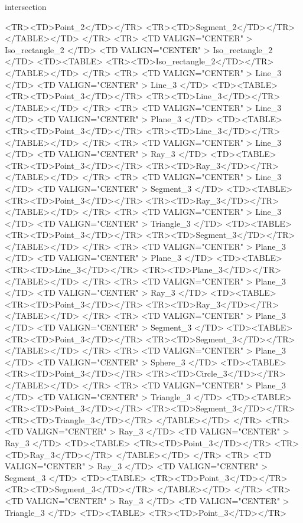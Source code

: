 \begin{ccRefFunction}{intersection}
\begin{ccHtmlOnly}
	<TR><TD>Point_2</TD></TR>
	<TR><TD>Segment_2</TD></TR>
      </TABLE></TD>
</TR>
<TR>
    <TD VALIGN="CENTER" > Iso_rectangle_2 </TD>
    <TD VALIGN="CENTER" > Iso_rectangle_2 </TD>
    <TD><TABLE>
	<TR><TD>Iso_rectangle_2</TD></TR>
      </TABLE></TD>
</TR>
<TR>
    <TD VALIGN="CENTER" > Line_3 </TD>
    <TD VALIGN="CENTER" > Line_3 </TD>
    <TD><TABLE>
	<TR><TD>Point_3</TD></TR>
	<TR><TD>Line_3</TD></TR>
        </TABLE></TD>
</TR>
<TR>
    <TD VALIGN="CENTER" > Line_3 </TD>
    <TD VALIGN="CENTER" > Plane_3 </TD>
    <TD><TABLE>
	<TR><TD>Point_3</TD></TR>
	<TR><TD>Line_3</TD></TR>
        </TABLE></TD>
</TR>
<TR>
    <TD VALIGN="CENTER" > Line_3 </TD>
    <TD VALIGN="CENTER" > Ray_3 </TD>
    <TD><TABLE>
	<TR><TD>Point_3</TD></TR>
	<TR><TD>Ray_3</TD></TR>
        </TABLE></TD>
</TR>
<TR>
    <TD VALIGN="CENTER" > Line_3 </TD>
    <TD VALIGN="CENTER" > Segment_3 </TD>
    <TD><TABLE>
	<TR><TD>Point_3</TD></TR>
	<TR><TD>Ray_3</TD></TR>
        </TABLE></TD>
</TR>
<TR>
    <TD VALIGN="CENTER" > Line_3 </TD>
    <TD VALIGN="CENTER" > Triangle_3 </TD>
    <TD><TABLE>
	<TR><TD>Point_3</TD></TR>
	<TR><TD>Segment_3</TD></TR>
        </TABLE></TD>
</TR>
<TR>
    <TD VALIGN="CENTER" > Plane_3 </TD>
    <TD VALIGN="CENTER" > Plane_3 </TD>
    <TD><TABLE>
	<TR><TD>Line_3</TD></TR>
	<TR><TD>Plane_3</TD></TR>
        </TABLE></TD>
</TR>
<TR>
    <TD VALIGN="CENTER" > Plane_3 </TD>
    <TD VALIGN="CENTER" > Ray_3 </TD>
    <TD><TABLE>
	<TR><TD>Point_3</TD></TR>
	<TR><TD>Ray_3</TD></TR>
        </TABLE></TD>
</TR>
<TR>
    <TD VALIGN="CENTER" > Plane_3 </TD>
    <TD VALIGN="CENTER" > Segment_3 </TD>
    <TD><TABLE>
	<TR><TD>Point_3</TD></TR>
	<TR><TD>Segment_3</TD></TR>
        </TABLE></TD>
</TR>
<TR>
    <TD VALIGN="CENTER" > Plane_3 </TD>
    <TD VALIGN="CENTER" > Sphere_3 </TD>
    <TD><TABLE>
	<TR><TD>Point_3</TD></TR>
	<TR><TD>Circle_3</TD></TR>
        </TABLE></TD>
</TR>
<TR>
    <TD VALIGN="CENTER" > Plane_3 </TD>
    <TD VALIGN="CENTER" > Triangle_3 </TD>
    <TD><TABLE>
	<TR><TD>Point_3</TD></TR>
	<TR><TD>Segment_3</TD></TR>
	<TR><TD>Triangle_3</TD></TR>
        </TABLE></TD>
</TR>
<TR>
    <TD VALIGN="CENTER" > Ray_3 </TD>
    <TD VALIGN="CENTER" > Ray_3 </TD>
    <TD><TABLE>
	<TR><TD>Point_3</TD></TR>
	<TR><TD>Ray_3</TD></TR>
        </TABLE></TD>
</TR>
<TR>
    <TD VALIGN="CENTER" > Ray_3 </TD>
    <TD VALIGN="CENTER" > Segment_3 </TD>
    <TD><TABLE>
	<TR><TD>Point_3</TD></TR>
	<TR><TD>Segment_3</TD></TR>
        </TABLE></TD>
</TR>
<TR>
    <TD VALIGN="CENTER" > Ray_3 </TD>
    <TD VALIGN="CENTER" > Triangle_3 </TD>
    <TD><TABLE>
	<TR><TD>Point_3</TD></TR>

\end{ccHtmlOnly}
\end{ccRefFunction}
